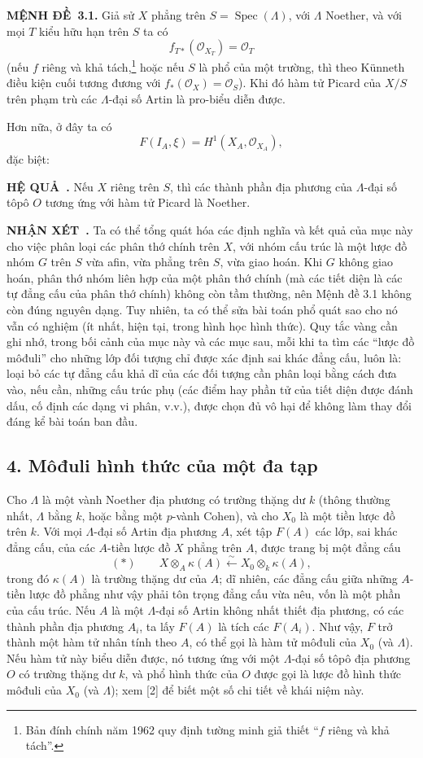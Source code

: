 \documentclass[11pt,twoside,openany]{book}
\numberwithin{equation}{section}
\newcommand{\src}[1]{%
  \phantomsection\hypertarget{src:\fgasourceid:#1}{}%
  \marginpar{\raggedleft\footnotesize\sffamily #1}%
}
\newcommand{\fgasourceid}{unset}
\newcommand{\result}[2]{\par\medskip\noindent\textbf{#1\if\relax\detokenize{#2}\relax\else\ #2\fi.}\quad}
\begin{document}
\src{384}
\result{MỆNH ĐỀ}{3.1} Giả sử $X$ phẳng trên
$S=\operatorname{Spec}(\Lambda)$, với $\Lambda$ Noether, và với mọi $T$ kiểu
hữu hạn trên $S$ ta có
\[
  f_{T*}(\mathcal O_{X_T})=\mathcal O_T
\]
(nếu $f$ riêng và khả tách,\footnote{Bản đính chính năm 1962 quy định tường
minh giả thiết ``$f$ riêng và khả tách''.} hoặc nếu $S$ là phổ của một trường,
thì theo Künneth điều kiện cuối tương đương với
$f_*(\mathcal O_X)=\mathcal O_S$). Khi đó hàm tử Picard của $X/S$ trên phạm
trù các $\Lambda$-đại số Artin là pro-biểu diễn được.

Hơn nữa, ở đây ta có
\[
  F(I_A,\xi)=H^1(X_A,\mathcal O_{X_A}),
\]
đặc biệt:

\result{HỆ QUẢ}{} Nếu $X$ riêng trên $S$, thì các thành phần địa phương của
$\Lambda$-đại số tôpô $O$ tương ứng với hàm tử Picard là Noether.

\result{NHẬN XÉT}{} Ta có thể tổng quát hóa các định nghĩa và kết quả của mục
này cho việc phân loại các phân thớ chính trên $X$, với nhóm cấu trúc là một
lược đồ nhóm $G$ trên $S$ vừa afin, vừa phẳng trên $S$, vừa giao hoán. Khi $G$
không giao hoán, phân thớ nhóm liên hợp của một phân thớ chính (mà các tiết
diện là các tự đẳng cấu của phân thớ chính) không còn tầm thường, nên Mệnh đề
3.1 không còn đúng nguyên dạng. Tuy nhiên, ta có thể sửa bài toán phổ quát sao
cho nó vẫn có nghiệm (ít nhất, hiện tại, trong hình học hình thức). Quy tắc
vàng cần ghi nhớ, trong bối cảnh của \src{385}mục này và các mục sau, mỗi khi
ta tìm các ``lược đồ môđuli'' cho những lớp đối tượng chỉ được xác định sai
khác đẳng cấu, luôn là: loại bỏ các tự đẳng cấu khả dĩ của các đối tượng cần
phân loại bằng cách đưa vào, nếu cần, những cấu trúc phụ (các điểm hay phần tử
của tiết diện được đánh dấu, cố định các dạng vi phân, v.v.), được chọn đủ vô
hại để không làm thay đổi đáng kể bài toán ban đầu.

\subsection*{4. Môđuli hình thức của một đa tạp}

Cho $\Lambda$ là một vành Noether địa phương có trường thặng dư $k$ (thông
thường nhất, $\Lambda$ bằng $k$, hoặc bằng một $p$-vành Cohen), và cho $X_0$
là một tiền lược đồ trên $k$. Với mọi $\Lambda$-đại số Artin địa phương $A$,
xét tập $F(A)$ các lớp, sai khác đẳng cấu, của các $A$-tiền lược đồ $X$ phẳng
trên $A$, được trang bị một đẳng cấu
\[
  (*)\qquad
  X\otimes_A\kappa(A)\xleftarrow{\sim}
  X_0\otimes_k\kappa(A),
\]
trong đó $\kappa(A)$ là trường thặng dư của $A$; dĩ nhiên, các đẳng cấu giữa
những $A$-tiền lược đồ phẳng như vậy phải tôn trọng đẳng cấu vừa nêu, vốn là
một phần của cấu trúc. Nếu $A$ là một $\Lambda$-đại số Artin không nhất thiết
địa phương, có các thành phần địa phương $A_i$, ta lấy $F(A)$ là tích các
$F(A_i)$. Như vậy, $F$ trở thành một hàm tử nhân tính theo $A$, có thể gọi là
hàm tử môđuli của $X_0$ (và $\Lambda$). Nếu hàm tử này biểu diễn được, nó tương
ứng với một $\Lambda$-đại số tôpô địa phương $O$ có trường thặng dư $k$, và
phổ hình thức của $O$ được gọi là lược đồ hình thức môđuli của $X_0$ (và
$\Lambda$); xem [2] để biết một số chi tiết về khái niệm này.
\end{document}
